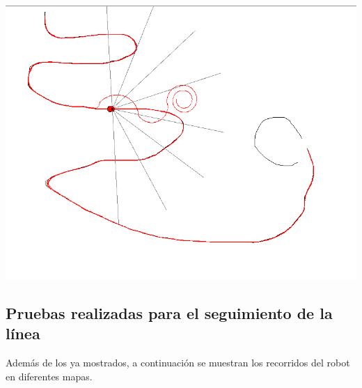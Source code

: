 \documentclass[11pt]{article}
\begin{document}
\includegraphics[width=.9\linewidth]{../doc-images/perpendicular.png}

\subsection{Pruebas realizadas para el seguimiento de la línea}
\label{sec-1-5}
Además de los ya mostrados, a continuación se muestran los recorridos del robot en diferentes mapas.
\end{document}
